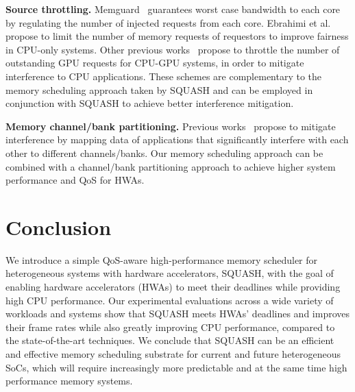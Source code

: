 \documentclass[10pt,letterpaper]{article}
\begin{document}
\noindent\textbf{Source throttling.} Memguard~\cite{memguard} guarantees worst
case bandwidth to each core by regulating the number of injected requests from
each core. Ebrahimi et al.~\cite{fst} propose to limit the number of memory requests of
requestors to improve fairness in CPU-only systems.
Other previous works~\cite{armwhite,schedulingCPUGPU} propose to throttle the
number of outstanding GPU requests for CPU-GPU systems, in order to mitigate
interference to CPU applications. These schemes are complementary to the memory
scheduling approach taken by SQUASH and can be employed in conjunction with
SQUASH to achieve better interference mitigation.

\noindent\textbf{Memory channel/bank partitioning.} Previous
works~\cite{mcp,bank-part,pact-bank-part} propose to mitigate interference by
mapping data of applications that significantly interfere with each other to
different channels/banks. Our memory scheduling approach can be combined with a
channel/bank partitioning approach to achieve higher system performance and QoS
for HWAs.
 \section{Conclusion} We introduce a simple QoS-aware high-performance memory
scheduler for heterogeneous systems with hardware accelerators, SQUASH, with the
goal of enabling hardware accelerators (HWAs) to meet their deadlines while
providing high CPU performance. Our experimental evaluations across a wide variety of
workloads and systems show that SQUASH meets HWAs' deadlines and improves their
frame rates while also greatly improving CPU performance, compared to the
state-of-the-art techniques. We conclude that SQUASH can be an efficient and effective
memory scheduling substrate for current and future heterogeneous SoCs, which
will require increasingly more predictable and at the same time high performance
memory systems. 



 
\newpage

{\small

}
\end{document}
